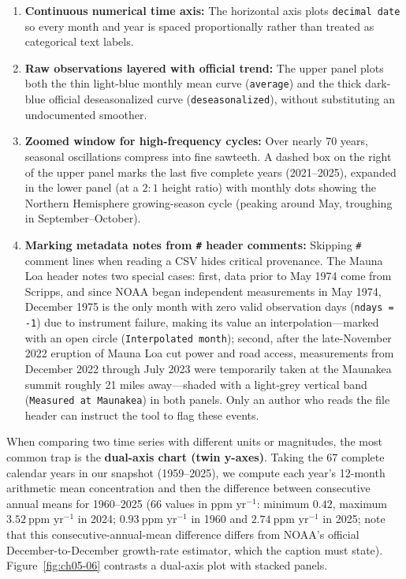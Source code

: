 \begin{enumerate}
\item \textbf{Continuous numerical time axis:} The horizontal axis plots \texttt{decimal date} so every month and year is spaced proportionally rather than treated as categorical text labels.
\item \textbf{Raw observations layered with official trend:} The upper panel plots both the thin light-blue monthly mean curve (\texttt{average}) and the thick dark-blue official deseasonalized curve (\texttt{deseasonalized}), without substituting an undocumented smoother.
\item \textbf{Zoomed window for high-frequency cycles:} Over nearly 70 years, seasonal oscillations compress into fine sawteeth. A dashed box on the right of the upper panel marks the last five complete years (2021--2025), expanded in the lower panel (at a $2:1$ height ratio) with monthly dots showing the Northern Hemisphere growing-season cycle (peaking around May, troughing in September--October).
\item \textbf{Marking metadata notes from \texttt{\#} header comments:} Skipping \texttt{\#} comment lines when reading a CSV hides critical provenance. The Mauna Loa header notes two special cases: first, data prior to May 1974 come from Scripps, and since NOAA began independent measurements in May 1974, December 1975 is the only month with zero valid observation days (\texttt{ndays = -1}) due to instrument failure, making its value an interpolation—marked with an open circle (\texttt{Interpolated month}); second, after the late-November 2022 eruption of Mauna Loa cut power and road access, measurements from December 2022 through July 2023 were temporarily taken at the Maunakea summit roughly 21 miles away—shaded with a light-grey vertical band (\texttt{Measured at Maunakea}) in both panels. Only an author who reads the file header can instruct the tool to flag these events.
\end{enumerate}

When comparing two time series with different units or magnitudes, the most common trap is the \textbf{dual-axis chart (twin y-axes)}. Taking the 67 complete calendar years in our snapshot (1959--2025), we compute each year's 12-month arithmetic mean concentration and then the difference between consecutive annual means for 1960--2025 (66 values in $\text{ppm yr}^{-1}$: minimum $0.42$, maximum $3.52\ \text{ppm yr}^{-1}$ in 2024; $0.93\ \text{ppm yr}^{-1}$ in 1960 and $2.74\ \text{ppm yr}^{-1}$ in 2025; note that this consecutive-annual-mean difference differs from NOAA's official December-to-December growth-rate estimator, which the caption must state). Figure~\ref{fig:ch05-06} contrasts a dual-axis plot with stacked panels.

